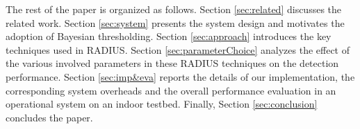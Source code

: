

The rest of the paper is organized as follows. Section \ref{sec:related} discusses the related work. Section \ref{sec:system} presents the system design and motivates the adoption of Bayesian thresholding. Section \ref{sec:approach} introduces the key techniques used in RADIUS. Section \ref{sec:parameterChoice} analyzes the effect of the various involved parameters in these RADIUS techniques on the detection performance. Section \ref{sec:imp&eva} reports the details of our implementation, the corresponding system overheads and the overall performance evaluation in an operational system on an indoor testbed. Finally, Section \ref{sec:conclusion} concludes the paper.




